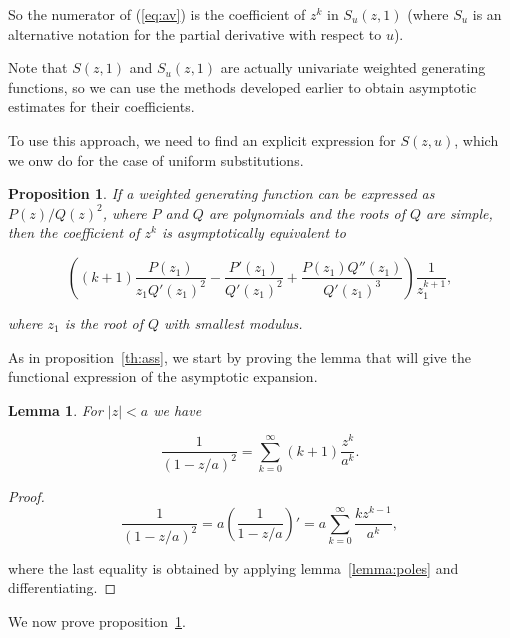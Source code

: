 \documentclass{article}
\newtheorem{lemma}{Lemma}
\newtheorem{proposition}{Proposition}
\begin{document}
So the numerator of (\ref{eq:av}) is the coefficient of $z^k$ in
$S_u(z,1)$ (where $S_u$ is an alternative notation for the partial
derivative with respect to $u$).

Note that $S(z,1)$ and $S_u(z,1)$ are
actually univariate weighted generating functions, so we can use the
methods developed earlier to obtain asymptotic estimates for their
coefficients.

To use this approach, we need to find an explicit expression for $S(z,u)$,
which we onw do for the case of uniform substitutions.





\begin{proposition}
\label{th:ass2}
If a weighted generating function can be expressed as $P(z)/Q(z)^2$, where
$P$ and $Q$ are polynomials and the roots of $Q$ are simple, then the
coefficient of $z^k$ is asymptotically equivalent to

\begin{equation}
\label{eq:ass2}
\left( (k+1)\frac{P(z_1)}{z_1 Q'(z_1)^2} - \frac{P'(z_1)}{Q'(z_1)^2} +
\frac{P(z_1)Q''(z_1)}{Q'(z_1)^3} \right)
\frac{1}{z_1^{k+1}},
\end{equation}

\noindent
where $z_1$ is the root of $Q$ with smallest \textit{modulus}.
\end{proposition}

As in proposition~\ref{th:ass}, we start by proving the lemma that will
give the functional expression of the asymptotic expansion.

\begin{lemma}
\label{lemma:poles2}
For $|z| < a$ we have

\begin{equation}
\label{eq:poles2}
\frac{1}{(1-z/a)^2} = \sum_{k=0}^\infty (k+1)\frac{z^k}{a^k}.
\end{equation}
\end{lemma}

\begin{proof}
\begin{equation*}
\frac{1}{(1-z/a)^2} = a \left( \frac{1}{1-z/a} \right)'
= a \sum_{k=0}^\infty \frac{kz^{k-1}}{a^k},
\end{equation*}

\noindent
where the last equality is obtained by applying lemma~\ref{lemma:poles}
and differentiating.
\end{proof}

We now prove proposition~\ref{th:ass2}.
\end{document}
